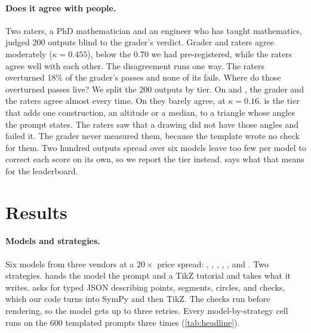 \documentclass{article}
\begin{document}
\paragraph{Does it agree with people.}
Two raters, a PhD mathematician and an engineer who has taught mathematics, judged 200 outputs blind to the grader's verdict.
Grader and raters agree moderately ($\kappa = 0.455$), below the 0.70 we had pre-registered, while the raters agree well with each other.
The disagreement runs one way.
The raters overturned 18\% of the grader's passes and none of its fails.
Where do those overturned passes live?
We split the 200 outputs by tier.
On \tone and \tthree, the grader and the raters agree almost every time.
On \ttwo they barely agree, at $\kappa = 0.16$.
\ttwo is the tier that adds one construction, an altitude or a median, to a triangle whose angles the prompt states.
The raters saw that a drawing did not have those angles and failed it.
The grader never measured them, because the template wrote no check for them.
Two hundred outputs spread over six models leave too few per model to correct each score on its own, so we report the tier instead.
 says what that means for the leaderboard.

\section{Results}
\label{sec:results}

\paragraph{Models and strategies.}
Six models from three vendors at a $20\times$ price spread: \opus, \sonnet, \haiku, \gpt, \geminipro, and \geminiflash.
Two strategies.
\rawcode hands the model the prompt and a TikZ tutorial and takes what it writes.
\structured asks for typed JSON describing points, segments, circles, and checks, which our code turns into SymPy and then TikZ.
The checks run before rendering, so the model gets up to three retries.
Every model-by-strategy cell runs on the 600 templated prompts three times (\cref{tab:headline}).
\end{document}
